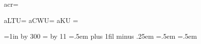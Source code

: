 


\let\!tacr=\\ %


\newdimen\LineThicknessUnit
\newdimen\StrutUnit
\newskip \InterColumnSpaceUnit
\newdimen\ColumnWidthUnit
\newdimen\KernUnit

\let\!taLTU=\LineThicknessUnit %
\let\!taCWU=\ColumnWidthUnit   %
\let\!taKU =\KernUnit          %

\newtoks\NormalTLTU
\newtoks\NormalTSU
\newtoks\NormalTICSU
\newtoks\NormalTCWU
\newtoks\NormalTKU

\NormalTLTU={1in \divide \LineThicknessUnit by 300 }
\NormalTSU ={\normalbaselineskip
  \divide \StrutUnit by 11 }  %
\NormalTICSU={.5em plus 1fil minus .25em}  %
\NormalTCWU ={.5em}
\NormalTKU  ={.5em}

\def\NormalTableUnits{%
  \LineThicknessUnit   =\the\NormalTLTU
  \StrutUnit           =\the\NormalTSU
  \InterColumnSpaceUnit=\the\NormalTICSU
  \ColumnWidthUnit     =\the\NormalTCWU
  \KernUnit            =\the\NormalTKU}

